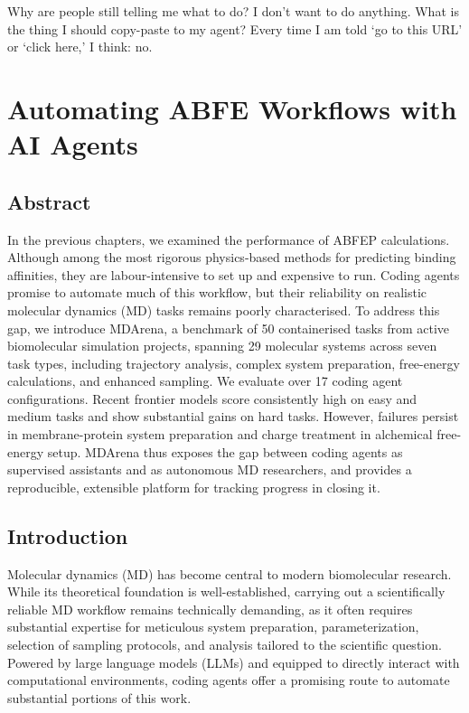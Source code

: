 \begin{savequote}[75mm]
Why are people still telling me what to do? I don't want to do anything. What is the thing I should copy-paste to my agent? Every time I am told `go to this URL' or `click here,' I think: no.
\end{savequote}

\chapter{Automating ABFE Workflows with AI Agents}
\section*{Abstract}
In the previous chapters, we examined the performance of ABFEP calculations. Although among the most rigorous physics-based methods for predicting binding affinities, they are labour-intensive to set up and expensive to run. Coding agents promise to automate much of this workflow, but their reliability on realistic molecular dynamics (MD) tasks remains poorly characterised. To address this gap, we introduce MDArena, a benchmark of 50 containerised tasks from active biomolecular simulation projects, spanning 29 molecular systems across seven task types, including trajectory analysis, complex system preparation, free-energy calculations, and enhanced sampling. We evaluate over 17 coding agent configurations. Recent frontier models score consistently high on easy and medium tasks and show substantial gains on hard tasks. However, failures persist in membrane-protein system preparation and charge treatment in alchemical free-energy setup. MDArena thus exposes the gap between coding agents as supervised assistants and as autonomous MD researchers, and provides a reproducible, extensible platform for tracking progress in closing it.



\section{Introduction}

Molecular dynamics (MD) has become central to modern biomolecular research.\cite{hollingsworth2018molecular,huggins2019biomolecular} While its theoretical foundation is well-established, carrying out a scientifically reliable MD workflow remains technically demanding, as it often requires substantial expertise for meticulous system preparation, parameterization, selection of sampling protocols, and analysis tailored to the scientific question. Powered by large language models (LLMs)\cite{zhao2023survey} and equipped to directly interact with computational environments, coding agents\cite{liu2024large} offer a promising route to automate substantial portions of this work. 

